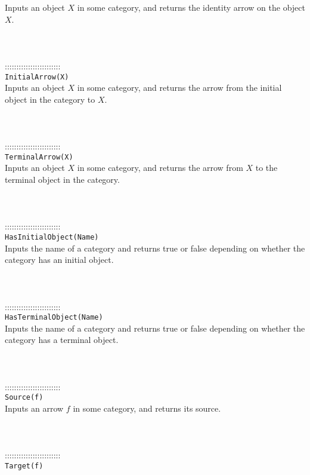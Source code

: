 \documentclass[a4paper,11pt]{report}
\begin{document}
{ Inputs an object $X$ in some category, and returns the identity arrow on the object $X$. \\
 \\
 \\
 \\
 ::::::::::::::::::::::::\\
 \texttt{InitialArrow(X) }\\
 

 Inputs an object $X$ in some category, and returns the arrow from the initial object in the
category to $X$. \\
 \\
 \\
 \\
 ::::::::::::::::::::::::\\
 \texttt{TerminalArrow(X) }\\
 

 Inputs an object $X$ in some category, and returns the arrow from $X$ to the terminal object in the category. \\
 \\
 \\
 \\
 ::::::::::::::::::::::::\\
 \texttt{HasInitialObject(Name) }\\
 

 Inputs the name of a category and returns true or false depending on whether
the category has an initial object. \\
 \\
 \\
 \\
 ::::::::::::::::::::::::\\
 \texttt{HasTerminalObject(Name) }\\
 

 Inputs the name of a category and returns true or false depending on whether
the category has a terminal object. \\
 \\
 \\
 \\
 ::::::::::::::::::::::::\\
 \texttt{Source(f) }\\
 

 Inputs an arrow $f$ in some category, and returns its source. \\
 \\
 \\
 \\
 ::::::::::::::::::::::::\\
 \texttt{Target(f) }\\
 

}
\end{document}
